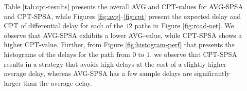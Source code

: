 Table \ref{tab:cpt-results} presents the overall AVG and CPT-values for AVG-SPSA and CPT-SPSA, while Figures \ref{fig:avg}--\ref{fig:cpt} present the expected delay and CPT of differential delay for each of the $12$ paths in Figure \ref{fig:road-net}.  
We observe that AVG-SPSA exhibits a lower AVG-value, while CPT-SPSA shows a higher CPT-value. 
Further, from Figure \ref{fig:histogram-perf} that presents the histograms of the delays for the path from $0$ to $1$, we observe that CPT-SPSA results in a strategy that avoids high delays at the cost of a slightly higher average delay, whereas AVG-SPSA has a few sample delays are significantly larger than the average delay. 



